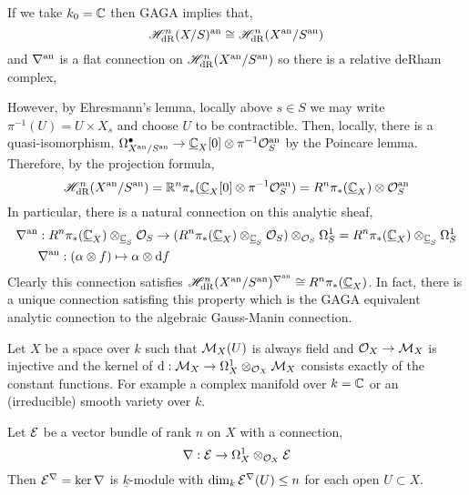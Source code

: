 \documentclass[12pt]{article}
\begin{document}
\begin{remark}
If we take $k_0 = \mathbb{C}$ then GAGA implies that,
\[ \mathscr{H}^n_{\mathrm{dR}}(X / S)^{\mathrm{an}} \cong \mathscr{H}^n_{\mathrm{dR}}(X^{\mathrm{an}} / S^{\mathrm{an}}) \]
and $\nabla^{\mathrm{an}}$ is a flat connection on $\mathscr{H}^n_{\mathrm{dR}}(X^{\mathrm{an}} / S^{\mathrm{an}})$ so there is a relative deRham complex,
\begin{center}
\end{center}
However, by Ehresmann's lemma, locally above $s \in S$ we may write $\pi^{-1}(U) = U \times X_s$ and choose $U$ to be contractible. Then, locally, there is a quasi-isomorphism, $\Omega^\bullet_{X^{\mathrm{an}} / S^{\mathrm{an}}} \to \underline{\mathbb{C}}_X[0] \otimes \pi^{-1} \mathcal{O}_{S}^{\mathrm{an}}$ by the Poincare lemma. Therefore, by the projection formula,
\[ \mathscr{H}^n_{\mathrm{dR}}(X^{\mathrm{an}} / S^{\mathrm{an}}) = \mathbb{R}^n \pi_* (\underline{\mathbb{C}}_X [0] \otimes \pi^{-1} \mathcal{O}_{S}^{\mathrm{an}}) = R^n \pi_*(\underline{\mathbb{C}}_X) \otimes \mathcal{O}_{S}^{\mathrm{an}} \] 
In particular, there is a natural connection on this analytic sheaf,
\begin{align*}
\nabla^{\mathrm{an}} & : R^n \pi_*(\underline{\mathbb{C}}_X) \otimes_{\underline{\mathbb{C}}_S} \mathcal{O}_{S} \to (R^n \pi_*(\underline{\mathbb{C}}_X) \otimes_{\underline{\mathbb{C}}_S} \mathcal{O}_{S}) \otimes_{\mathcal{O}_{S}} \Omega^1_S = R^n \pi_*(\underline{\mathbb{C}}_X) \otimes_{\underline{\mathbb{C}}_S} \Omega^1_S
\\
& \nabla^{\mathrm{an}} : (\alpha \otimes f) \mapsto \alpha \otimes \mathrm{d}{f} 
\end{align*}
Clearly this connection satisfies $\mathscr{H}^n_{\mathrm{dR}}(X^{\mathrm{an}} / S^{\mathrm{an}})^{\nabla^{\mathrm{an}}} \cong R^n \pi_*(\underline{\mathbb{C}}_X)$. In fact, there is a unique connection satisfing this property which is the GAGA equivalent analytic connection to the algebraic Gauss-Manin connection.
\end{remark}


\begin{rmk}
Let $X$ be a space over $k$ such that $\mathcal{M}_X(U)$ is always field and $\mathcal{O}_{X} \to \mathcal{M}_X$ is injective and the kernel of $\mathrm{d} : \mathcal{M}_X \to \Omega^1_X \otimes_{\mathcal{O}_{X}} \mathcal{M}_X$ consists exactly of the constant functions. For example a complex manifold over $k = \mathbb{C}$ or an (irreducible) smooth variety over $k$.
\end{rmk}

\begin{prop}
Let $\mathcal{E}$ be a vector bundle of rank $n$ on $X$ with a connection,
\[ \nabla : \mathcal{E} \to \Omega^1_X \otimes_{\mathcal{O}_{X}} \mathcal{E} \]
Then $\mathcal{E}^\nabla = \ker{\nabla}$ is $\underline{k}$-module with $\dim_k \mathcal{E}^\nabla(U) \le n$ for each open $U \subset X$. 
\end{prop}
\end{document}
